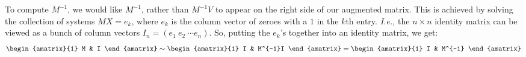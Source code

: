 To compute $M^{-1}$, we would like $M^{-1}$, rather than $M^{-1}V$ to appear on the right side of our augmented matrix.
This is achieved by  solving the collection of systems $MX=e_k$, where $e_k$ is the column vector of zeroes with a $1$ in the $k$th entry.  
{\it I.e.,} the $n\times n$ identity matrix can be viewed as a bunch of column vectors $I_n=(e_1 \ e_2 \ \cdots e_n)$. So, putting the $e_k$'s together into an identity matrix, we get:
\[
\begin{amatrix}{1}
M & I
\end{amatrix}
\sim
\begin{amatrix}{1}
I & M^{-1}I
\end{amatrix}
=\begin{amatrix}{1}
I & M^{-1}
\end{amatrix}
\]


